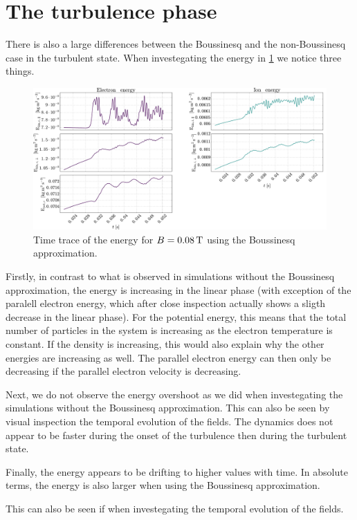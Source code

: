 \section{The turbulence phase}
%
There is also a large differences between the Boussinesq and the non-Boussinesq case in the turbulent state.
When investegating the energy in \cref{fig:energies008B} we notice three things.
%
\begin{figure}[htb]
    \centering
    \includegraphics[width=1.0\textwidth]{fig/results/compareBouss/energies008B}
    \caption{Time trace of the energy for $B=0.08\, \text{T}$ using the Boussinesq approximation.}
    \label{fig:energies008B}
\end{figure}
%
Firstly, in contrast to what is observed in simulations without the Boussinesq approximation, the energy is increasing in the linear phase (with exception of the paralell electron energy, which after close inspection actually shows a sligth decrease in the linear phase).
For the potential energy, this means that the total number of particles in the system is increasing as the electron temperature is constant.
If the density is increasing, this would also explain why the other energies are increasing as well.
The parallel electron energy can then only be decreasing if the parallel electron velocity is decreasing.

Next, we do not observe the energy overshoot as we did when investegating the simulations without the Boussinesq approximation.
This can also be seen by visual inspection the temporal evolution of the fields.
The dynamics does not appear to be faster during the onset of the turbulence then during the turbulent state.

Finally, the energy appears to be drifting to higher values with time.
In absolute terms, the energy is also larger when using the Boussinesq approximation.

This can also be seen if when investegating the temporal evolution of the fields.

